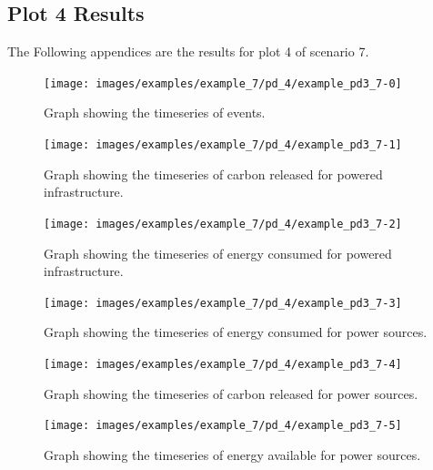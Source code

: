 \documentclass{l4proj}
\begin{document}
\subsection{Plot 4 Results}\label{apen:subsec:scen7plot4}
The Following appendices are the results for plot 4 of scenario 7.
\clearpage
\begin{figure}[htbp]
    \centering
    \texttt{[image: images/examples/example\_7/pd\_4/example\_pd3\_7-0]}
    ~
    \caption{Graph showing the timeseries of events.}
    \label{fig:example_pd3_7-0}
\end{figure}
    \clearpage
\begin{figure}[htbp]
    \centering
    \texttt{[image: images/examples/example\_7/pd\_4/example\_pd3\_7-1]}
    ~
    \caption{Graph showing the timeseries of carbon released for powered infrastructure.}
    \label{fig:example_pd3_7-1}
\end{figure}
    \clearpage
\begin{figure}[htbp]
    \centering
    \texttt{[image: images/examples/example\_7/pd\_4/example\_pd3\_7-2]}
    ~
    \caption{Graph showing the timeseries of energy consumed for powered infrastructure.}
    \label{fig:example_pd3_7-2}
\end{figure}
    \clearpage
\begin{figure}[htbp]
    \centering
    \texttt{[image: images/examples/example\_7/pd\_4/example\_pd3\_7-3]}
    ~
    \caption{Graph showing the timeseries of energy consumed for power sources.}
    \label{fig:example_pd3_7-3}
\end{figure}
    \clearpage
\begin{figure}[htbp]
    \centering
    \texttt{[image: images/examples/example\_7/pd\_4/example\_pd3\_7-4]}
    ~
    \caption{Graph showing the timeseries of carbon released for power sources.}
    \label{fig:example_pd3_7-4}
\end{figure}
    \clearpage
\begin{figure}[htbp]
    \centering
    \texttt{[image: images/examples/example\_7/pd\_4/example\_pd3\_7-5]}
    ~
    \caption{Graph showing the timeseries of energy available for power sources.}
    \label{fig:example_pd3_7-5}
\end{figure}





\end{document}
